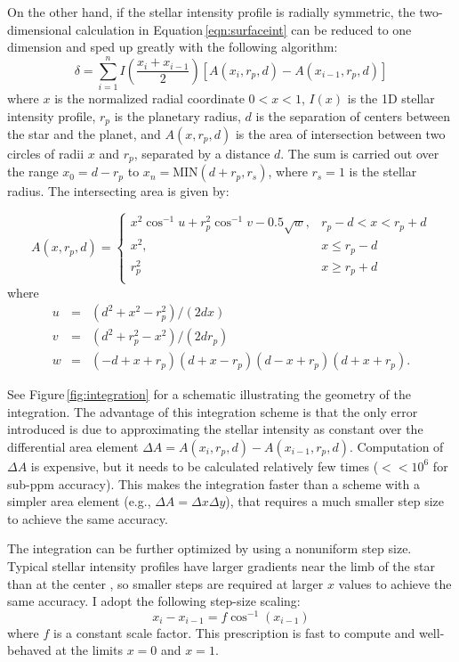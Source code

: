 \documentclass[12pt,preprint]{aastex}
\begin{document}
On the other hand, if the stellar intensity profile is radially symmetric, the two-dimensional calculation in Equation\,\ref{eqn:surfaceint} can be reduced to one dimension and sped up greatly with the following algorithm: 
\begin{equation}
\delta = \sum_{i=1}^{n} I\left(\frac{x_i+x_{i-1}}{2}\right) \left[A(x_{i}, r_p, d) - A(x_{i-1}, r_p, d)\right]
\end{equation}
where $x$ is the normalized radial coordinate $0 < x < 1$, $I(x)$ is the 1D stellar intensity profile, $r_p$ is the planetary radius, $d$ is the separation of centers between the star and the planet, and $A(x, r_p, d)$ is the area of intersection between two circles of radii $x$ and $r_p$, separated by a distance $d$.  The sum is carried out over the range $x_0 = d - r_p$ to $x_n = \textrm{MIN}(d + r_p, r_s)$, where $r_s = 1$ is the stellar radius.  The intersecting area is given by:

\begin{equation}
A(x, r_p, d) = 
\begin{cases}
x^2\cos^{-1}{u} + r_p^2\cos^{-1}{v} - 0.5\sqrt{w}, & r_p -d < x < r_p + d\\
x^2, & x \le r_p - d\\
r_p^2 & x \ge r_p +d \\
\end{cases}
\end{equation}
where
\begin{eqnarray}
u &=& (d^2+x^2-r_p^2)/(2dx)\\
v &=& (d^2 + r_p^2 -x^2)/(2dr_p) \\
w &=& (-d+x+r_p)(d+x-r_p)(d-x+r_p)(d+x+r_p).
\end{eqnarray}

See Figure\,\ref{fig:integration} for a schematic illustrating the geometry of the integration.  The advantage of this integration scheme is that the only error introduced is due to approximating the stellar intensity as constant over the differential area element $\Delta A = A(x_i, r_p, d) - A(x_{i-1}, r_p, d)$.  Computation of $\Delta A$ is expensive, but it needs to be calculated relatively few times ($<<10^{6}$ for sub-ppm accuracy). This makes the integration faster than a scheme with a simpler area element (e.g., $\Delta A = \Delta x \Delta y$), that requires a much smaller step size to achieve the same accuracy.

The integration can be further optimized by using a nonuniform step size.  Typical stellar intensity profiles have larger gradients near the limb of the star than at the center \citep[e.g.][]{claret00}, so smaller steps are required at larger $x$ values to achieve the same accuracy.  I adopt the following step-size scaling: 
$$
x_i - x_{i-1}  = f\cos^{-1}\left(x_{i-1}\right)
$$  
where $f$ is a constant scale factor. This prescription is fast to compute and well-behaved at the limits $x=0$ and $x=1$.
\end{document}
